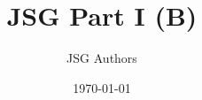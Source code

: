 \documentclass[11pt]{article}
\title{JSG Part I (B)}
\author{JSG Authors}
\date{\today}
\begin{document}
\maketitle

\newcommand{\JSGWrap}{B}








\nocite{*}
\printbibliography
\end{document}
